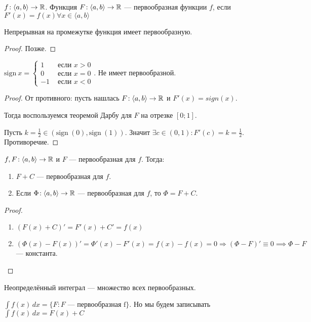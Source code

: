 \begin{definition}
    $f\!: \langle a, b \rangle \to \mathbb{R}$. Функция  $F\!: \langle a, b \rangle \to \mathbb{R}$ --- первообразная функции  $f$, если  $F'(x) = f(x) \forall x \in \langle a, b \rangle$
\end{definition}
\begin{theorem}
    Непрерывная на промежутке функция имеет первообразную.
\end{theorem}
\begin{proof}
    Позже.
\end{proof}
\begin{remark}
    $\text{sign}\ x = \begin{cases} 1 & \text{ если } x > 0 \\ 0 & \text{ если } x = 0 \\ -1 & \text{ если }  x < 0 \end{cases}$. Не имеет первообразной.
\end{remark}
\begin{proof}
    От противного: пусть нашлась $F\!: \langle a, b \rangle \to \mathbb{R}$ и $F'(x) = sign(x)$.
    
    Тогда воспользуемся теоремой Дарбу для $F$ на отрезке $[0; 1]$.
    
    Пусть $k = \frac{1}{2} \in (\text{sign}\ (0), \text{sign}\ (1))$. Значит $\exists c \in (0, 1) \!: F'(c) = k = \frac{1}{2}$. Противоречие.
\end{proof}
\begin{theorem}
    $f, F\!: \langle a, b \rangle \to \mathbb{R}$ и  $F$ --- первообразная для  $f$. Тогда: 
     \begin{enumerate}
         \item $F+C$ --- первообразная для  $f$.
         \item  Если  $\Phi\!: \langle a, b \rangle \to \mathbb{R}$ --- первообразная для  $f$, то  $\Phi = F + C$. 
    \end{enumerate}
\end{theorem}
\begin{proof}
    \slashn
    \begin{enumerate}
        \item $(F(x) + C)' = F'(x) + C' = f(x)$
        \item $(\Phi(x) - F(x))' = \Phi'(x) - F'(x) = f(x) - f(x) = 0 \Rightarrow (\Phi - F)' \equiv 0 \implies \Phi -F$ --- константа. 
    \end{enumerate}
\end{proof}
\begin{definition}
    Неопределённый интеграл --- множество всех первообразных.

    $\int f(x)\,dx = \{F\!: F \text{ --- первообразная f}\}$. Но мы будем записывать $\int f(x)\,dx = F(x) + C$
\end{definition}

